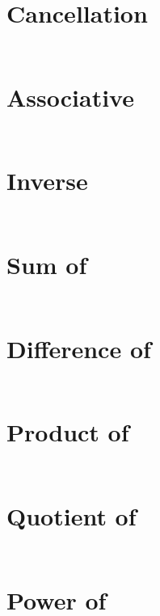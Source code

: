 \documentclass{report}
\begin{document}
    \section{Cancellation}
    \begin{gather*}
    \end{gather*}

    \section{Associative}
    \begin{gather*}
    \end{gather*}

    \section{Inverse}
    \begin{gather*}
    \end{gather*}

    \section{Sum of}
    \begin{gather*}
    \end{gather*}

    \section{Difference of}
    \begin{gather*}
    \end{gather*}

    \section{Product of}
    \begin{gather*}
    \end{gather*}

    \section{Quotient of}
    \begin{gather*}
    \end{gather*}

    \section{Power of}
    \begin{gather*}
    \end{gather*}
\end{document}

